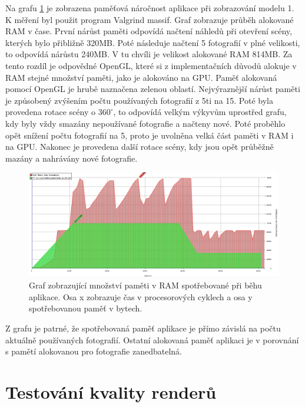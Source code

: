 \documentclass[11pt,twoside,a4paper]{book}
\begin{document}
Na grafu \ref{fig:massif} je zobrazena paměťová náročnost aplikace při zobrazování modelu 1. K měření byl použit program Valgrind massif. Graf zobrazuje průběh alokované RAM v čase. První nárůst paměti odpovídá načtení náhledů při otevření scény, kterých bylo přibližně 320MB. Poté následuje načtení 5 fotografií v plné velikosti, to odpovídá nárůstu 240MB. V tu chvíli je velikost alokované RAM 814MB. Za tento rozdíl je odpovědné OpenGL, které si z implementačních důvodů alokuje v RAM stejné množství paměti, jako je alokováno na GPU. Paměť alokovaná pomocí OpenGL je hrubě naznačena zelenou oblastí. Nejvýraznější nárůst paměti je způsobený zvýšením počtu používaných fotografií z 5ti na 15. Poté byla provedena rotace scény o $360^{\circ}$, to odpovídá velkým výkyvům uprostřed grafu, kdy byly vždy smazány nepoužívané fotografie a načteny nové. Poté proběhlo opět snížení počtu fotografií na 5, proto je uvolněna velká část paměti v RAM i na GPU. Nakonec je provedena další rotace scény, kdy jsou opět průběžně mazány a nahrávány nové fotografie.

\begin{figure}[h]
\begin{center}
\includegraphics[width=\textwidth]{figures/massif}
\caption{Graf zobrazující množství paměti v RAM spotřebované při běhu aplikace. Osa x zobrazuje čas v procesorových cyklech a osa y spotřebovanou paměť v bytech.}
\label{fig:massif}
\end{center}
\end{figure}

Z grafu je patrné, že spotřebovaná paměť aplikace je přímo závislá na počtu aktuálně používaných fotografií. Ostatní alokovaná paměť aplikaci je v porovnání s pamětí alokovanou pro fotografie zanedbatelná.

\section{Testování kvality renderů}
\end{document}
